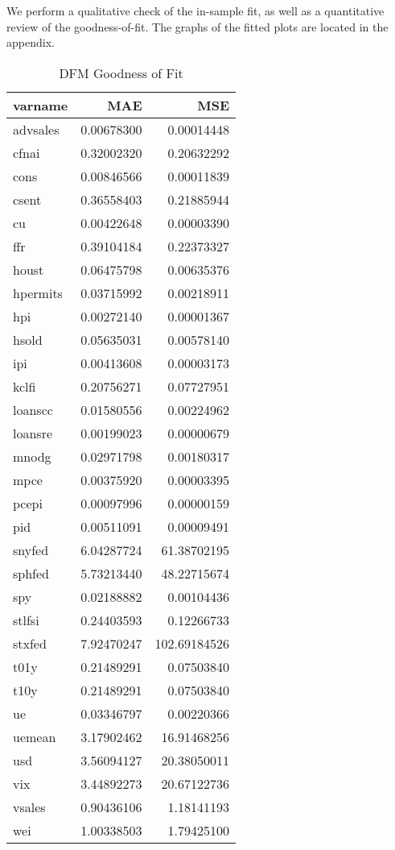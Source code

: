 \documentclass[11pt, letterpaper]{article}\usepackage[]{graphicx}\usepackage[]{color}
\begin{document}
We perform a qualitative check of the in-sample fit, as well as a quantitative review of the goodness-of-fit. The graphs of the fitted plots are located in the appendix.
\begin{table}[H]
\centering
\begingroup\footnotesize
\begin{tabular}{lrr}
  \hline
varname & MAE & MSE \\ 
  \hline
advsales & 0.00678300 & 0.00014448 \\ 
  cfnai & 0.32002320 & 0.20632292 \\ 
  cons & 0.00846566 & 0.00011839 \\ 
  csent & 0.36558403 & 0.21885944 \\ 
  cu & 0.00422648 & 0.00003390 \\ 
  ffr & 0.39104184 & 0.22373327 \\ 
  houst & 0.06475798 & 0.00635376 \\ 
  hpermits & 0.03715992 & 0.00218911 \\ 
  hpi & 0.00272140 & 0.00001367 \\ 
  hsold & 0.05635031 & 0.00578140 \\ 
  ipi & 0.00413608 & 0.00003173 \\ 
  kclfi & 0.20756271 & 0.07727951 \\ 
  loanscc & 0.01580556 & 0.00224962 \\ 
  loansre & 0.00199023 & 0.00000679 \\ 
  mnodg & 0.02971798 & 0.00180317 \\ 
  mpce & 0.00375920 & 0.00003395 \\ 
  pcepi & 0.00097996 & 0.00000159 \\ 
  pid & 0.00511091 & 0.00009491 \\ 
  snyfed & 6.04287724 & 61.38702195 \\ 
  sphfed & 5.73213440 & 48.22715674 \\ 
  spy & 0.02188882 & 0.00104436 \\ 
  stlfsi & 0.24403593 & 0.12266733 \\ 
  stxfed & 7.92470247 & 102.69184526 \\ 
  t01y & 0.21489291 & 0.07503840 \\ 
  t10y & 0.21489291 & 0.07503840 \\ 
  ue & 0.03346797 & 0.00220366 \\ 
  uemean & 3.17902462 & 16.91468256 \\ 
  usd & 3.56094127 & 20.38050011 \\ 
  vix & 3.44892273 & 20.67122736 \\ 
  vsales & 0.90436106 & 1.18141193 \\ 
  wei & 1.00338503 & 1.79425100 \\ 
   \hline
\end{tabular}
\endgroup
\caption{DFM Goodness of Fit} 
\end{table}
\end{document}
